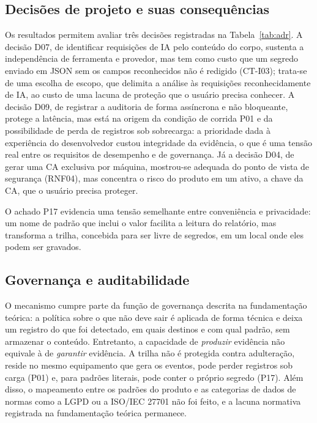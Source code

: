 \subsection{Decisões de projeto e suas consequências}

Os resultados permitem avaliar três decisões registradas na Tabela~\ref{tab:adr}. A decisão D07, de identificar requisições de IA pelo conteúdo do corpo, sustenta a independência de ferramenta e provedor, mas tem como custo que um segredo enviado em JSON sem os campos reconhecidos não é redigido (CT-I03); trata-se de uma escolha de escopo, que delimita a análise às requisições reconhecidamente de IA, ao custo de uma lacuna de proteção que o usuário precisa conhecer. A decisão D09, de registrar a auditoria de forma assíncrona e não bloqueante, protege a latência, mas está na origem da condição de corrida P01 e da possibilidade de perda de registros sob sobrecarga: a prioridade dada à experiência do desenvolvedor custou integridade da evidência, o que é uma tensão real entre os requisitos de desempenho e de governança. Já a decisão D04, de gerar uma CA exclusiva por máquina, mostrou-se adequada do ponto de vista de segurança (RNF04), mas concentra o risco do produto em um ativo, a chave da CA, que o usuário precisa proteger.

O achado P17 evidencia uma tensão semelhante entre conveniência e privacidade: um nome de padrão que inclui o valor facilita a leitura do relatório, mas transforma a trilha, concebida para ser livre de segredos, em um local onde eles podem ser gravados.

\subsection{Governança e auditabilidade}

O mecanismo cumpre parte da função de governança descrita na fundamentação teórica: a política sobre o que não deve sair é aplicada de forma técnica e deixa um registro do que foi detectado, em quais destinos e com qual padrão, sem armazenar o conteúdo. Entretanto, a capacidade de \textit{produzir} evidência não equivale à de \textit{garantir} evidência. A trilha não é protegida contra adulteração, reside no mesmo equipamento que gera os eventos, pode perder registros sob carga (P01) e, para padrões literais, pode conter o próprio segredo (P17). Além disso, o mapeamento entre os padrões do produto e as categorias de dados de normas como a LGPD ou a ISO/IEC 27701 não foi feito, e a lacuna normativa registrada na fundamentação teórica permanece.

